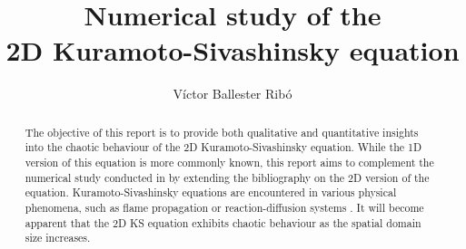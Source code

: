 \documentclass[twoside]{article}
\title{Numerical study of the\\2D Kuramoto-Sivashinsky equation}
\author{Víctor Ballester Ribó}
\date{\parbox{\linewidth}{\centering
Instabilities and Nonlinear Phenomena\endgraf
M2 - Applied and Theoretical Mathematics\endgraf
Université Paris-Dauphine, PSL\endgraf
\today}}
\begin{document}
\maketitle
\begin{abstract}
  The objective of this report is to provide both qualitative and quantitative insights into the chaotic behaviour of the 2D Kuramoto-Sivashinsky equation. While the 1D version of this equation is more commonly known, this report aims to complement the numerical study conducted in \cite{Kalogirou2015} by extending the bibliography on the 2D version of the equation. Kuramoto-Sivashinsky equations are encountered in various physical phenomena, such as flame propagation or reaction-diffusion systems \cite{Kuramoto,Sivashinsky1977}. It will become apparent that the 2D KS equation exhibits chaotic behaviour as the spatial domain size increases.
\end{abstract}
\end{document}
